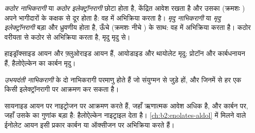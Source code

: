 \begin{definition}[कठोर और मृदु स्पीशीज़]\label{def:b2:frontier-orbitals:hard-soft}
\emph{कठोर नाभिकरागी} या \emph{कठोर इलेक्ट्रॉनरागी}
 छोटा होता है, केंद्रित आवेश रखता है और उसका
 (क्रमशः ) अपने भागीदारों के कक्षक से दूर होता है: वह  में अभिक्रिया करता है। \emph{मृदु नाभिकरागी} या \emph{मृदु इलेक्ट्रॉनरागी}
 बड़ा और ध्रुवणीय होता है, ऊँचे 
(क्रमशः नीचे ) के साथ: वह  में अभिक्रिया करता है। कठोर वरीयता से
कठोर से अभिक्रिया करता है, मृदु मृदु से।
\end{definition}

हाइड्रॉक्साइड आयन और फ़्लुओराइड आयन  हैं, आयोडाइड और थायोलेट
मृदु; प्रोटॉन और कार्बधनायन  हैं, हैलोऐल्केन का
कार्बन मृदु।

\begin{definition}[उभयदंती नाभिकरागी]\label{def:b2:frontier-orbitals:ambident}
\emph{उभयदंती नाभिकरागी} के दो नाभिकरागी परमाणु होते हैं
जो संयुग्मन से जुड़े हों, और जिनमें से हर एक किसी इलेक्ट्रॉनरागी पर आक्रमण कर सकता है।
\end{definition}

 सायनाइड आयन पर नाइट्रोजन पर आक्रमण करते हैं, जहाँ ऋणात्मक आवेश अधिक है,
और  कार्बन पर, जहाँ उसके  का गुणांक बड़ा है:
हैलोऐल्केन नाइट्राइल  देता है। \cref{ch:b2:enolates-aldol} में मिलने वाले
ईनोलेट आयन इसी प्रकार कार्बन या ऑक्सीजन पर अभिक्रिया करते हैं।

